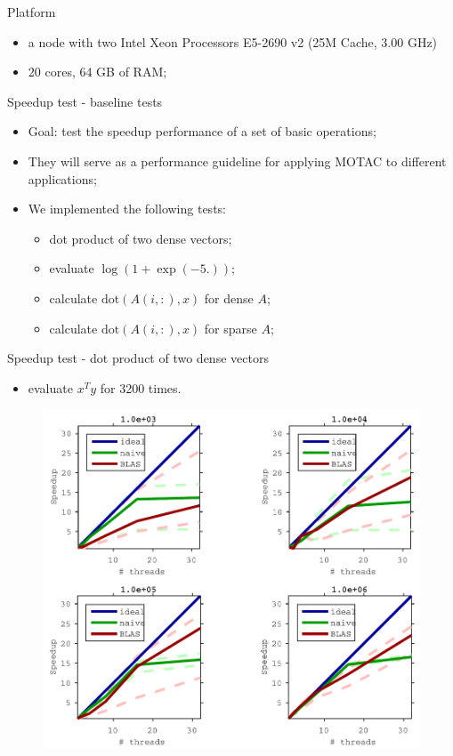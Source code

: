 \documentclass[hyperref,handout,compress,9pt,mathserif]{beamer}
\begin{document}
\begin{frame} {Platform}
\begin{itemize}
\item a node with two Intel Xeon Processors E5-2690 v2 (25M Cache, 3.00 GHz)
\item 20 cores, 64 GB of RAM;
\end{itemize}


\end{frame}


\begin{frame}{Speedup test - baseline tests}
\begin{itemize}
\item Goal: test the speedup performance of a set of basic operations;
\item They will serve as a performance guideline for applying MOTAC to different applications;
\item We implemented the following tests:
\begin{itemize}
\item dot product of two dense vectors;
\item evaluate $\log(1 + \exp(-5.))$;
\item calculate $\text{dot}(A(i, :), x)$ for dense $A$;
\item calculate $\text{dot}(A(i, :), x)$ for sparse $A$; 

\end{itemize}
\end{itemize}

\end{frame}

\begin{frame}{Speedup test - dot product of two dense vectors}
\begin{itemize}
\item evaluate $x^T y$ for 3200 times.
\end{itemize}


\begin{figure}[!h]
        \centering
                \includegraphics[width=.8\textwidth]{./figs/ds_vec_dot_prod_cropped.pdf}
\end{figure}

\end{frame}
\end{document}
